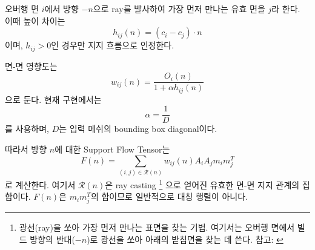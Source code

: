 \documentclass[11pt,a4paper]{article}
\begin{document}
오버행 면 $i$에서 방향 $-n$으로 ray를 발사하여 가장 먼저 만나는 유효 면을 $j$라 한다.
이때 높이 차이는
\begin{equation}
h_{ij}(n)=(c_i-c_j)\cdot n
\end{equation}
이며, $h_{ij}>0$인 경우만 지지 흐름으로 인정한다.

면-면 영향도는
\begin{equation}
w_{ij}(n)
=
\frac{O_i(n)}{1+\alpha h_{ij}(n)}
\end{equation}
으로 둔다.
현재 구현에서는
\begin{equation}
\alpha = \frac{1}{D}
\end{equation}
를 사용하며, $D$는 입력 메쉬의 bounding box diagonal이다.

따라서 방향 $n$에 대한 Support Flow Tensor는
\begin{equation}
F(n)
=
\sum_{(i,j)\in \mathcal{R}(n)}
w_{ij}(n)
A_iA_j
m_i m_j^T
\end{equation}
로 계산한다.
여기서 $\mathcal{R}(n)$은 ray casting%
\footnote{광선(ray)을 쏘아 가장 먼저 만나는 표면을 찾는 기법. 여기서는 오버행 면에서
빌드 방향의 반대($-n$)로 광선을 쏘아 아래의 받침면을 찾는 데 쓴다.
참고: \cite{roth1982}}
으로 얻어진 유효한 면-면 지지 관계의 집합이다.
$F(n)$은 $m_i m_j^T$의 합이므로 일반적으로 대칭 행렬이 아니다.
\end{document}
